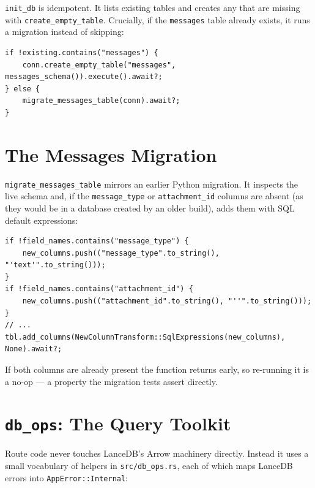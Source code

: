 \verb|init_db| is idempotent. It lists existing tables and creates any that are
missing with \verb|create_empty_table|. Crucially, if the \verb|messages| table
already exists, it runs a migration instead of skipping:

\begin{lstlisting}
if !existing.contains("messages") {
    conn.create_empty_table("messages", messages_schema()).execute().await?;
} else {
    migrate_messages_table(conn).await?;
}
\end{lstlisting}

\section{The Messages Migration}

\verb|migrate_messages_table| mirrors an earlier Python migration. It inspects the
live schema and, if the \verb|message_type| or \verb|attachment_id| columns are
absent (as they would be in a database created by an older build), adds them with
SQL default expressions:

\begin{lstlisting}
if !field_names.contains("message_type") {
    new_columns.push(("message_type".to_string(), "'text'".to_string()));
}
if !field_names.contains("attachment_id") {
    new_columns.push(("attachment_id".to_string(), "''".to_string()));
}
// ...
tbl.add_columns(NewColumnTransform::SqlExpressions(new_columns), None).await?;
\end{lstlisting}

If both columns are already present the function returns early, so re-running it
is a no-op --- a property the migration tests assert directly.

\section{\texttt{db\_ops}: The Query Toolkit}

Route code never touches LanceDB's Arrow machinery directly. Instead it uses a
small vocabulary of helpers in \verb|src/db_ops.rs|, each of which maps LanceDB
errors into \verb|AppError::Internal|:

